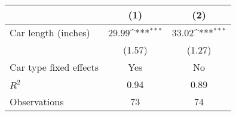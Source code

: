 {
\def\sym#1{\ifmmode^{#1}\else\(^{#1}\)\fi}
\begin{tabular}{l*{2}{c}}
\hline\hline
            &\multicolumn{1}{c}{(1)}         &\multicolumn{1}{c}{(2)}         \\
\hline
Car length (inches)&       29.99\sym{***}&       33.02\sym{***}\\
            &      (1.57)         &      (1.27)         \\
\hline
Car type fixed effects&         Yes         &          No         \\
$R^{2}$     &        0.94         &        0.89         \\
Observations&          73         &          74         \\
\hline\hline
\end{tabular}
}

